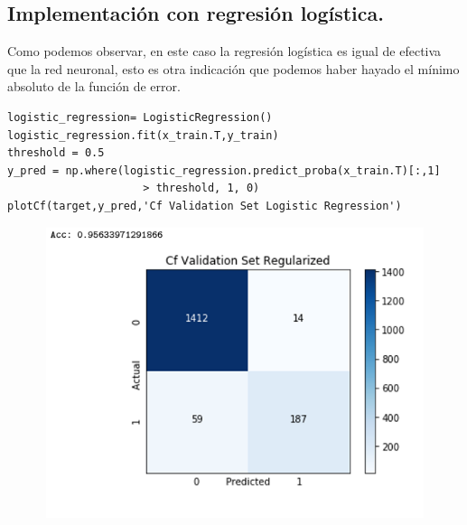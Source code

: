\documentclass[a4paper,10pt]{article}
\begin{document}
\subsection{Implementación con regresión logística.}
Como podemos observar, en este caso la regresión logística es igual de efectiva que la red neuronal, esto es otra indicación que podemos haber hayado el mínimo absoluto de la función de error.
\begin{lstlisting}
logistic_regression= LogisticRegression()
logistic_regression.fit(x_train.T,y_train)
threshold = 0.5
y_pred = np.where(logistic_regression.predict_proba(x_train.T)[:,1]
					 > threshold, 1, 0)
plotCf(target,y_pred,'Cf Validation Set Logistic Regression')
\end{lstlisting}
\begin{figure}[H]
\centering
\includegraphics[width=12.0cm, height=8.5cm]{Annotation 2020-03-23 161410}
\end{figure}
\newpage
\end{document}
